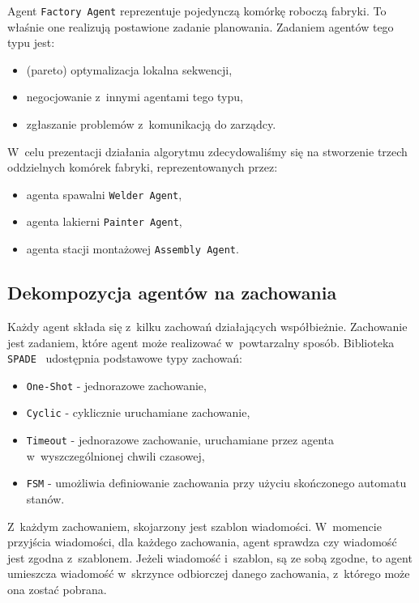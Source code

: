 Agent \texttt{Factory Agent} reprezentuje pojedynczą komórkę roboczą fabryki. To właśnie one realizują postawione zadanie planowania. Zadaniem agentów tego typu jest:
\begin{itemize}
    \item (pareto) optymalizacja lokalna sekwencji,
    \item negocjowanie z~innymi agentami tego typu,
    \item zgłaszanie problemów z~komunikacją do zarządcy.
\end{itemize}

W~celu prezentacji działania algorytmu zdecydowaliśmy się na stworzenie trzech oddzielnych komórek fabryki, reprezentowanych przez:
\begin{itemize}
    \item agenta spawalni \texttt{Welder Agent},
    \item agenta lakierni \texttt{Painter Agent},
    \item agenta stacji montażowej \texttt{Assembly Agent}.
\end{itemize}

\subsection{Dekompozycja agentów na zachowania}
Każdy agent składa się z~kilku zachowań działających współbieżnie. Zachowanie jest zadaniem, które agent może realizować w~powtarzalny sposób. Biblioteka \texttt{SPADE}~\cite{spade} udostępnia podstawowe typy zachowań:
\begin{itemize}
    \item \texttt{One-Shot} - jednorazowe zachowanie,
    \item \texttt{Cyclic} - cyklicznie uruchamiane zachowanie,
    \item \texttt{Timeout} - jednorazowe zachowanie, uruchamiane przez agenta w~wyszczególnionej chwili czasowej,
    \item \texttt{FSM} - umożliwia definiowanie zachowania przy użyciu skończonego automatu stanów.
\end{itemize}

Z~każdym zachowaniem, skojarzony jest szablon wiadomości. W~momencie przyjścia wiadomości, dla każdego zachowania, agent sprawdza czy wiadomość jest zgodna z~szablonem. Jeżeli wiadomość i~szablon, są ze sobą zgodne, to agent umieszcza wiadomość w~skrzynce odbiorczej danego zachowania, z~którego może ona zostać pobrana. 


